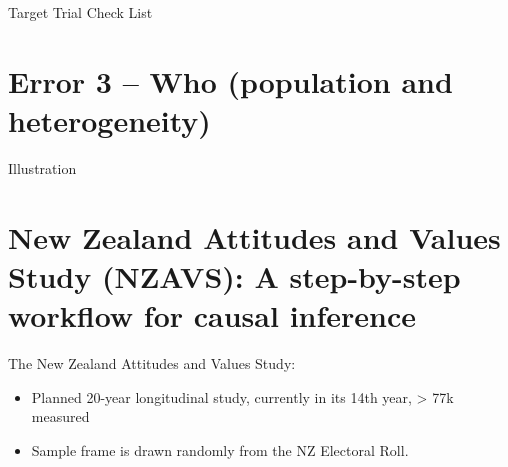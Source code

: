 \documentclass[
  ignorenonframetext,
  aspectratio=169,
  xcolor=\{dvipsnames\}]{beamer}
\begin{document}
\begin{frame}{Target Trial Check List}
\label{target-trial-check-list}
\begin{table}

\caption{\label{tbl-target-trial}Target-trial specification for the
hormone-therapy example.}


\end{table}%
\end{frame}

\section{Error 3 -- Who (population and
heterogeneity)}\label{error-3-who-population-and-heterogeneity}

\begin{frame}{Illustration}
\label{illustration}
\end{frame}

\section{New Zealand Attitudes and Values Study (NZAVS): A step-by-step
workflow for causal
inference}\label{new-zealand-attitudes-and-values-study-nzavs-a-step-by-step-workflow-for-causal-inference}

\begin{frame}{The New Zealand Attitudes and Values Study:}
\label{the-new-zealand-attitudes-and-values-study}
\begin{itemize}
\item
  Planned 20-year longitudinal study, currently in its 14th year,
  \textgreater{} 77k measured
\item
  Sample frame is drawn randomly from the NZ Electoral Roll.
\end{itemize}
\end{frame}
\end{document}
